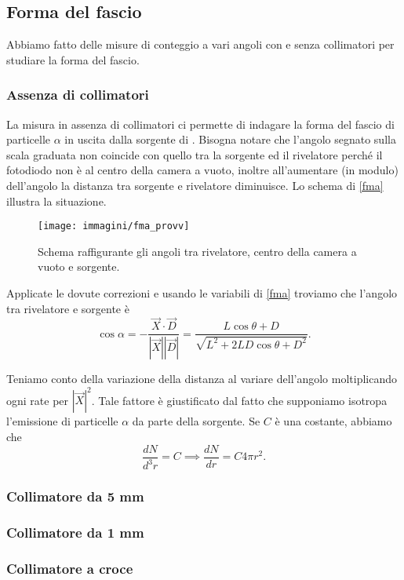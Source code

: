 \subsection{Forma del fascio}

Abbiamo fatto delle misure di conteggio a vari angoli con e senza collimatori per studiare la forma del fascio.

\subsubsection{Assenza di collimatori}

La misura in assenza di collimatori ci permette di indagare la forma del fascio di particelle $\alpha$ in uscita dalla sorgente di \am{}.
Bisogna notare che l'angolo segnato sulla scala graduata non coincide con quello tra la sorgente ed il rivelatore perché il fotodiodo non è al centro della camera a vuoto, inoltre all'aumentare (in modulo) dell'angolo la distanza tra sorgente e rivelatore diminuisce. 
Lo schema di \autoref{fma} illustra la situazione.

\begin{figure}[h]
\centering
\texttt{[image: immagini/fma\_provv]}
\caption{Schema raffigurante gli angoli tra rivelatore, centro della camera a vuoto e sorgente.}
\label{fma}
\end{figure}

Applicate le dovute correzioni e usando le variabili di \autoref{fma} troviamo che l'angolo tra rivelatore e sorgente è
\begin{equation}
\cos{\alpha}= -\frac{\vec{X} \cdot \vec{D} }{ |\vec{X}| |\vec{D}| } = \frac{ L \cos{\theta} + D }{ \sqrt{ L^2+2LD\cos{\theta}+D^2  } }.
\end{equation}

Teniamo conto della variazione della distanza al variare dell'angolo moltiplicando ogni rate per $|\vec{X}|^2$.
Tale fattore è giustificato dal fatto che supponiamo isotropa l'emissione di particelle $\alpha$ da parte della sorgente.
Se $C$ è una costante, abbiamo che $$ \frac{dN}{d^3r}=C \implies \frac{dN}{dr}=C 4\pi r^2. $$




\subsubsection{Collimatore da 5\! mm}

\subsubsection{Collimatore da 1\! mm}

\subsubsection{Collimatore a croce}